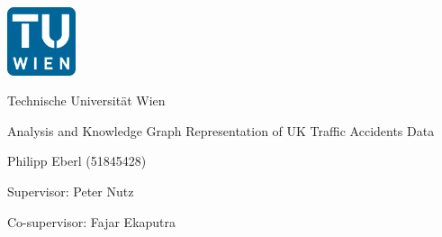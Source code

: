 \begin{titlepage}
\begin{center}


\includegraphics[width=20mm]{../images/tu_wien_logo.png__511x511_q85_subsampling-2.png} \\

\large

Technische Universität Wien

\vspace{6cm}

\Large{}

\vspace{.5cm}

\huge{Analysis and Knowledge Graph Representation of UK Traffic Accidents Data}

\vspace{.5cm}

\Large{Philipp Eberl (51845428)}

\vspace{.5cm}

\Large{Supervisor: Peter Nutz}

\vspace{.5cm}

\Large{Co-supervisor: Fajar Ekaputra}

\vfill

\end{center}
\end{titlepage}
